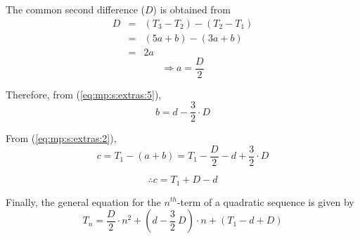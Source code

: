 {The common second difference ($D$) is obtained from
\begin{eqnarray*}
D &=& (T_3 - T_2) - (T_2 - T_1) \\
&=& (5a + b) - (3a + b) \\
&=& 2a
\end{eqnarray*}
\begin{equation}
\label{eq:mp:s:extras:6}
\Rightarrow a = \frac{D}{2}
\end{equation}

Therefore, from (\ref{eq:mp:s:extras:5}),
\begin{equation}
\label{eq:mp:s:extras:7}
b = d - \frac{3}{2} \cdot D
\end{equation}

From (\ref{eq:mp:s:extras:2}),
\begin{equation*}
c = T_1 - (a + b) = T_1 - \frac{D}{2} - d + \frac{3}{2} \cdot D
\end{equation*}

\begin{equation}
\label{eq:mp:s:extras:8}
\therefore c = T_1 + D - d
\end{equation}

Finally, the general equation for the $n^{th}$-term of a quadratic sequence is
given by
\begin{equation}
\label{eq:mp:s:extras:9}
T_n = \frac{D}{2} \cdot {n^2} + (d - \frac {3} {2} \: D) \cdot n + (T_1 - d + D)
\end{equation}}


